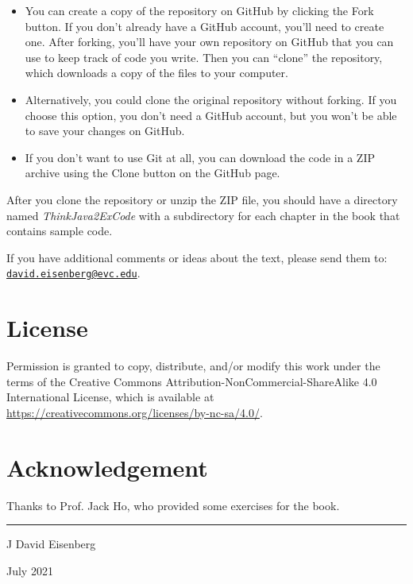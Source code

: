 \begin{itemize}

\item You can create a copy of the repository on GitHub by clicking the {\sf Fork} button.
If you don't already have a GitHub account, you'll need to create one.
After forking, you'll have your own repository on GitHub that you can use to keep track of code you write.
Then you can ``clone'' the repository, which downloads a copy of the files to your computer.

\item Alternatively, you could clone the original repository without forking.
If you choose this option, you don't need a GitHub account, but you won't be able to save your changes on GitHub.

\item If you don't want to use Git at all, you can download the code in a ZIP archive using the {\sf Clone} button on the GitHub page.

\end{itemize}

After you clone the repository or unzip the ZIP file, you should have a directory named {\it ThinkJava2ExCode} with a subdirectory for each chapter in the book that contains sample code.


If you have additional comments or ideas about the text, please send them to: \href{mailto:david.eisenberg@evc.edu}{\tt david.eisenberg@evc.edu}.

\section*{License}
Permission is granted to copy, distribute, and/or modify this work under the
terms of the Creative Commons Attribution-NonCommercial-ShareAlike 4.0
International License, which is available at
\url{https://creativecommons.org/licenses/by-nc-sa/4.0/}.

\section*{Acknowledgement}
Thanks to Prof. Jack Ho, who provided some exercises for the book.

\rule{\textwidth}{0.1mm}

\hfill J David Eisenberg

\hfill July 2021
